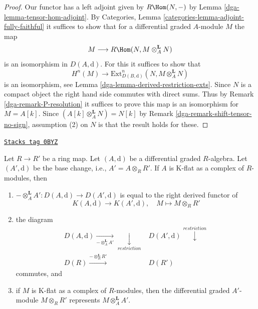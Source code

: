 \begin{proof}

Our functor has a left adjoint given by
$R\Hom(N, -)$ by Lemma \ref{dga-lemma-tensor-hom-adjoint}.
By Categories, Lemma \ref{categories-lemma-adjoint-fully-faithful}
it suffices to show that for a differential graded $A$-module $M$
the map
$$
M \longrightarrow R\Hom(N, M \otimes_A^\mathbf{L} N)
$$
is an isomorphism in $D(A, \text{d})$. For this it suffices to show that
$$
H^n(M) \longrightarrow
\text{Ext}^n_{D(B, \text{d})}(N, M \otimes_A^\mathbf{L} N)
$$
is an isomorphism, see Lemma \ref{dga-lemma-derived-restriction-exts}.
Since $N$ is a compact object the right hand side commutes
with direct sums. Thus by Remark \ref{dga-remark-P-resolution}
it suffices to prove this map is an isomorphism for $M = A[k]$.
Since $(A[k] \otimes_A^\mathbf{L} N) = N[k]$ by
Remark \ref{dga-remark-shift-tensor-no-sign},
assumption (2) on $N$ is that the result holds for these.
\end{proof}

\begin{lemma}
\label{dga-lemma-base-change-K-flat}
\href{https://stacks.math.columbia.edu/tag/0BYZ}{\texttt{Stacks tag 0BYZ}}

Let $R \to R'$ be a ring map. Let $(A, \text{d})$ be a differential
graded $R$-algebra. Let $(A', \text{d})$ be the base change, i.e.,
$A' = A \otimes_R R'$. If $A$ is K-flat as a complex of $R$-modules,
then
\begin{enumerate}
\item $- \otimes_A^\mathbf{L} A' : D(A, \text{d}) \to D(A', \text{d})$
is equal to the right derived functor of
$$
K(A, \text{d}) \longrightarrow K(A', \text{d}),\quad
M \longmapsto M \otimes_R R'
$$
\item the diagram
$$
\begin{array}{cc}D(A, \text{d}) \underset{- \otimes_A^\mathbf{L} A'}{\longrightarrow}\underset{restriction}{\downarrow} & D(A', \text{d}) \overset{restriction}{\downarrow} \\ D(R) \overset{- \otimes_R^\mathbf{L} R'}{\longrightarrow} & D(R')\end{array}
$$
commutes, and
\item if $M$ is K-flat as a complex of $R$-modules, then the
differential graded $A'$-module $M \otimes_R R'$ represents
$M \otimes_A^\mathbf{L} A'$.
\end{enumerate}
\end{lemma}

